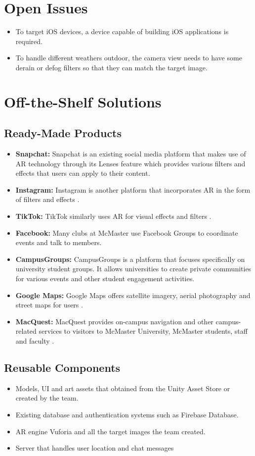 \documentclass[12pt]{article}
\begin{document}
\section{Open Issues}
\begin{itemize}
  \item To target iOS devices, a device capable of building iOS applications is required.
  \item To handle different weathers outdoor, the camera view needs to have some derain or defog filters so that they can match the target image.
\end{itemize}

\section{Off-the-Shelf Solutions}
\subsection{Ready-Made Products}
\begin{itemize}
  \item \textbf{Snapchat:} Snapchat is an existing social media platform that makes use of AR technology through its Lenses feature\cite{lens} which provides various filters and effects that users can apply to their content.
  \item \textbf{Instagram:} Instagram is another platform that incorporates AR in the form of filters and effects \cite{spark studio}.
  \item \textbf{TikTok:} TikTok similarly uses AR for visual effects and filters \cite{effect house}.
  \item \textbf{Facebook:} Many clubs at McMaster use Facebook Groups \cite{fb groups} to coordinate events and talk to members.
  \item \textbf{CampusGroups:} CampusGroups is a platform that focuses specifically on university student groups. \cite{campus groups} It allows universities to create private communities for various events and other student engagement activities.
  \item \textbf{Google Maps:} Google Maps offers satellite imagery, aerial photography and street maps for users \cite{google maps}.
  \item \textbf{MacQuest:} MacQuest provides on-campus navigation and other campus-related services to visitors to McMaster University, McMaster students, staff and faculty \cite{macquest}.
\end{itemize}
\subsection{Reusable Components}
\begin{itemize}
  \item Models, UI and art assets that obtained from the Unity Asset Store or created by the team.
  \item Existing database and authentication systems such as Firebase Database.
  \item AR engine Vuforia and all the target images the team created.
  \item Server that handles user location and chat messages
\end{itemize}
\end{document}
